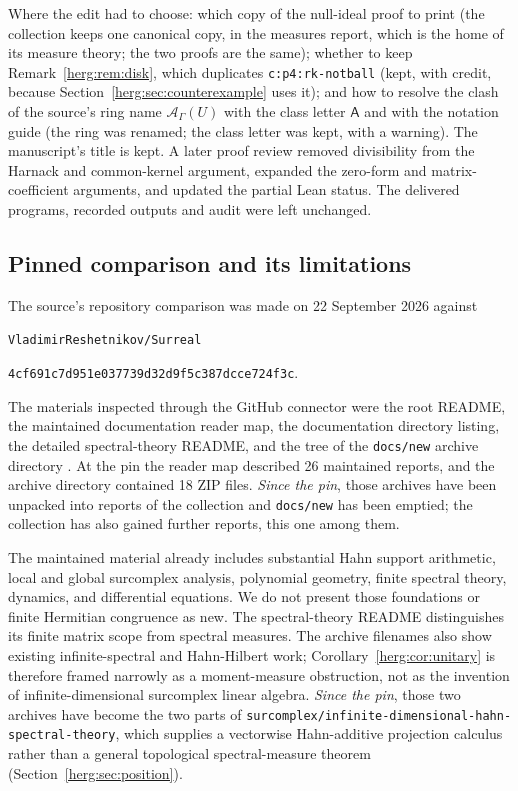 \documentclass[11pt,letterpaper]{article}
\theoremstyle{definition}
\newcommand{\repo}[1]{\nolinkurl{#1}}%
\newcommand{\lbl}[1]{\nolinkurl{#1}}%
\numberwithin{equation}{section}
\begin{document}
Where the edit had to choose: which copy of the null-ideal proof to print (the collection keeps one canonical copy, in the measures report, which is the home of its measure theory; the two proofs are the same); whether to keep Remark~\ref{herg:rem:disk}, which duplicates \lbl{c:p4:rk-notball} (kept, with credit, because Section~\ref{herg:sec:counterexample} uses it); and how to resolve the clash of the source's ring name $\mathscr A_\Gamma(U)$ with the class letter $\mathsf A$ and with the notation guide (the ring was renamed; the class letter was kept, with a warning). The manuscript's title is kept. A later proof review removed divisibility
from the Harnack and common-kernel argument, expanded the zero-form and
matrix-coefficient arguments, and updated the partial Lean status. The
delivered programs, recorded outputs and audit were left unchanged.

\subsection{Pinned comparison and its limitations}
\label{herg:app:pinned}

The source's repository comparison was made on 22 September 2026 against
\begin{center}
\texttt{VladimirReshetnikov/Surreal}\par
\texttt{4cf691c7d951e037739d32d9f5c387dcce724f3c}.
\end{center}
The materials inspected through the GitHub connector were the root README, the maintained documentation reader map, the documentation directory listing, the detailed spectral-theory README, and the tree of the \texttt{docs/new} archive directory \cite{Repo}. At the pin the reader map described 26 maintained reports, and the archive directory contained 18 ZIP files. \emph{Since the pin}, those archives have been unpacked into reports of the collection and \texttt{docs/new} has been emptied; the collection has also gained further reports, this one among them.

The maintained material already includes substantial Hahn support arithmetic, local and global surcomplex analysis, polynomial geometry, finite spectral theory, dynamics, and differential equations. We do not present those foundations or finite Hermitian congruence as new. The spectral-theory README distinguishes its finite matrix scope from spectral measures. The archive filenames also show existing infinite-spectral and Hahn-Hilbert work; Corollary~\ref{herg:cor:unitary} is therefore framed narrowly as a moment-measure obstruction, not as the invention of infinite-dimensional surcomplex linear algebra. \emph{Since the pin}, those two archives have become the two parts of \repo{surcomplex/infinite-dimensional-hahn-spectral-theory}, which supplies a vectorwise Hahn-additive projection calculus rather than a general topological spectral-measure theorem (Section~\ref{herg:sec:position}).
\end{document}
